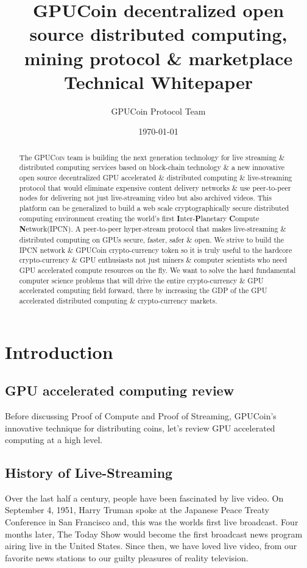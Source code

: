 \documentclass{article}
\title{GPUCoin decentralized 
open source 
 distributed computing, mining protocol \& marketplace Technical Whitepaper}
\author{GPUCoin Protocol Team}
\date{\today}
\begin{document}

\maketitle

\begin{abstract}
The \textsc{GPUCoin} team is building the next generation technology for live streaming \& distributed computing services based on block-chain technology \& a new innovative open source decentralized GPU accelerated \& distributed computing \& live-streaming protocol that would eliminate expensive content delivery networks \& use peer-to-peer nodes for delivering not just live-streaming video but also archived videos. This platform can be generalized to build a web scale cryptographically secure distributed computing environment creating the world's first \textbf{I}nter-\textbf{P}lanetary \textbf{C}ompute \textbf{N}etwork(\textsc{IPCN}). A peer-to-peer hyper-stream protocol that makes live-streaming \& distributed computing on GPUs secure, faster, safer \& open. We strive to build the IPCN network \& GPUCoin crypto-currency token so it is truly useful to the hardcore crypto-currency \& GPU enthusiasts not just miners \& computer scientists who need GPU accelerated compute resources on the fly. We want to solve the hard fundamental computer science problems that will drive the entire crypto-currency \& GPU accelerated computing field forward, there by increasing the GDP of the GPU accelerated distributed computing \& crypto-currency markets.

\end{abstract}
\newpage

\tableofcontents
\newpage

\section{Introduction}
\subsection{GPU accelerated computing review}
Before discussing Proof of Compute and Proof of Streaming, GPUCoin's innovative technique for distributing coins, let’s review GPU accelerated computing at a high level.


\subsection{History of Live-Streaming}
Over the last half a century, people have been fascinated by live video. On September 4, 1951, Harry Truman spoke at the Japanese Peace Treaty Conference in San Francisco and, this was the worlds first live broadcast. Four months later, The Today Show would become the first broadcast news program airing live in the United States. Since then, we have loved live video, from our favorite news stations to our guilty pleasures of reality television.
\end{document}
